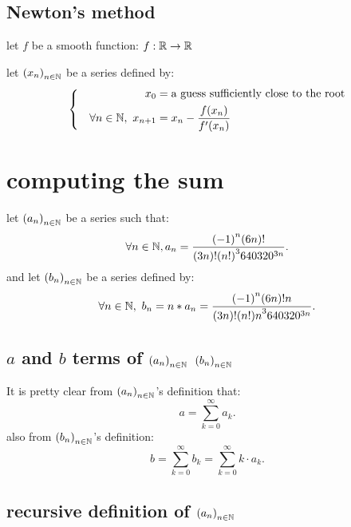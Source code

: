 \documentclass[fleqn]{report}
\begin{document}
\section{Newton's method}
let $ f$ be a smooth function: $ f : \mathbb R \to \mathbb R$

\noindent
let $ {(x_n)}_{n \in \mathbb N}$ be a series defined by:
\begin{align*}
  \left\{
  \begin{aligned}
    x_0                                & = \text{a guess sufficiently close to the root} \\
    \quad \forall n \in \mathbb N,\ x_{n + 1} & = x_n - \frac{f(x_n)}{f'(x_n)}
  \end{aligned}
  \right.
\end{align*}

\chapter{computing the sum}

let ${(a_n)}_{n \in \mathbb N}$ be a series such that:
\[
  \forall n \in \mathbb N, a_n = \frac{{(-1)}^n(6n)!}{(3n)!{(n!)}^{3}640320^{3n}}
  .\]
and let ${(b_n)}_{n \in \mathbb N}$ be a series defined by:
\[
  \forall n  \in \mathbb N,\ b_n = n * a_n = \frac{{(-1)}^n(6n)!n}{(3n)!{(n!)n}^{3}640320^{3n}}
  .\]

\section{$a$ and  $ b$  terms of  ${(a_n)}_{n \in \mathbb N}$  ${(b_n)}_{n \in \mathbb N}$}
It is pretty clear from $ {(a_n)}_{n \in \mathbb N}$'s definition that:
\[
  a = \sum_{k=0}^{\infty} a_k
  .\]
also from $ {(b_n)}_{n \in \mathbb N}$'s definition:
\[
  b = \sum_{k=0}^{\infty} b_k = \sum_{k=0}^{\infty} k \cdot a_k
  .\]

\section{recursive definition of ${(a_n)}_{n \in \mathbb N}$}

\end{document}
